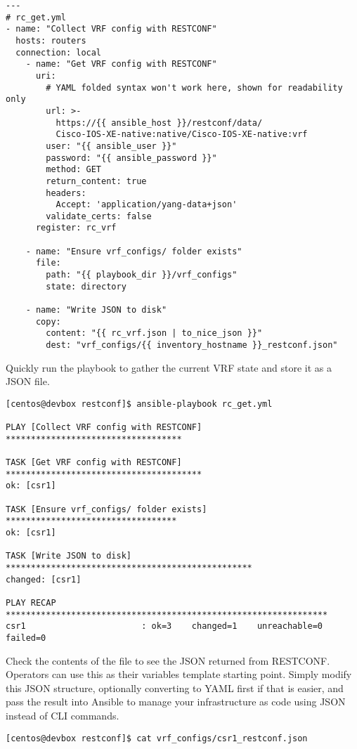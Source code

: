 \begin{verbatim}
---
# rc_get.yml
- name: "Collect VRF config with RESTCONF"
  hosts: routers
  connection: local
    - name: "Get VRF config with RESTCONF"
      uri:
        # YAML folded syntax won't work here, shown for readability only
        url: >-
          https://{{ ansible_host }}/restconf/data/
          Cisco-IOS-XE-native:native/Cisco-IOS-XE-native:vrf
        user: "{{ ansible_user }}"
        password: "{{ ansible_password }}"
        method: GET
        return_content: true
        headers:
          Accept: 'application/yang-data+json'
        validate_certs: false
      register: rc_vrf

    - name: "Ensure vrf_configs/ folder exists"
      file:
        path: "{{ playbook_dir }}/vrf_configs"
        state: directory

    - name: "Write JSON to disk"
      copy:
        content: "{{ rc_vrf.json | to_nice_json }}"
        dest: "vrf_configs/{{ inventory_hostname }}_restconf.json"
\end{verbatim}

Quickly run the playbook to gather the current VRF state and store it
as a JSON file.

\begin{verbatim}
[centos@devbox restconf]$ ansible-playbook rc_get.yml

PLAY [Collect VRF config with RESTCONF] ***********************************

TASK [Get VRF config with RESTCONF] ***************************************
ok: [csr1]

TASK [Ensure vrf_configs/ folder exists] **********************************
ok: [csr1]

TASK [Write JSON to disk] *************************************************
changed: [csr1]

PLAY RECAP ****************************************************************
csr1                       : ok=3    changed=1    unreachable=0    failed=0
\end{verbatim}

Check the contents of the file to see the JSON returned from RESTCONF\@.
Operators can use this as their variables template starting point. Simply
modify this JSON structure, optionally converting to YAML first if that
is easier, and pass the result into Ansible to manage your infrastructure
as code using JSON instead of CLI commands.

\begin{verbatim}
[centos@devbox restconf]$ cat vrf_configs/csr1_restconf.json
\end{verbatim}

